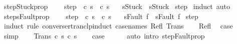 \begin{isabellebody}
\isanewline
{}\isamarkupfalse%
\ step{\isacharunderscore}Stuck{\isacharunderscore}prop{\isacharcolon}\ \isanewline
\ \ \ step{\isacharcolon}\ {\isachardoublequoteopen}{\isasymGamma}{\isasymturnstile}\ {\isacharparenleft}c{\isacharcomma}\ s{\isacharparenright}\ {\isasymrightarrow}\ {\isacharparenleft}c{\isacharprime}{\isacharcomma}\ s{\isacharprime}{\isacharparenright}{\isachardoublequoteclose}\isanewline
\ \ \ {\isachardoublequoteopen}s{\isacharequal}Stuck\ {\isasymLongrightarrow}\ s{\isacharprime}{\isacharequal}Stuck{\isachardoublequoteclose}\isanewline
%
\isadelimproof
%
\endisadelimproof
%
\isatagproof
{}\isamarkupfalse%
\ step\isanewline
{}\isamarkupfalse%
\ {\isacharparenleft}induct{\isacharparenright}\ auto%
\endisatagproof
{\isafoldproof}%
%
\isadelimproof
\isanewline
%
\endisadelimproof
\isanewline
{}\isamarkupfalse%
\ steps{\isacharunderscore}Fault{\isacharunderscore}prop{\isacharcolon}\ \isanewline
\ \ \ step{\isacharcolon}\ {\isachardoublequoteopen}{\isasymGamma}{\isasymturnstile}\ {\isacharparenleft}c{\isacharcomma}\ s{\isacharparenright}\ {\isasymrightarrow}\isactrlsup {\isacharasterisk}\ {\isacharparenleft}c{\isacharprime}{\isacharcomma}\ s{\isacharprime}{\isacharparenright}{\isachardoublequoteclose}\isanewline
\ \ \ {\isachardoublequoteopen}s{\isacharequal}Fault\ f\ {\isasymLongrightarrow}\ s{\isacharprime}{\isacharequal}Fault\ f{\isachardoublequoteclose}\isanewline
%
\isadelimproof
%
\endisadelimproof
%
\isatagproof
{}\isamarkupfalse%
\ step\isanewline
{}\isamarkupfalse%
\ {\isacharparenleft}induct\ rule{\isacharcolon}\ converse{\isacharunderscore}rtranclp{\isacharunderscore}induct{}\ {\isacharbrackleft}case{\isacharunderscore}names\ Refl\ Trans{\isacharbrackright}{\isacharparenright}\isanewline
\ \ \isamarkupfalse%
\ Refl\ \isamarkupfalse%
\ {\isacharquery}case\ \isamarkupfalse%
\ simp\isanewline
{}\isamarkupfalse%
\isanewline
\ \ \isamarkupfalse%
\ {\isacharparenleft}Trans\ c\ s\ c{\isacharprime}{\isacharprime}\ s{\isacharprime}{\isacharprime}{\isacharparenright}\isanewline
\ \ \isamarkupfalse%
\ {\isacharquery}case\isanewline
\ \ \ \ \isamarkupfalse%
\ {\isacharparenleft}auto\ intro{\isacharcolon}\ step{\isacharunderscore}Fault{\isacharunderscore}prop{\isacharparenright}\isanewline
{}\isamarkupfalse%
%
\endisatagproof
{\isafoldproof}%

\end{isabellebody}
